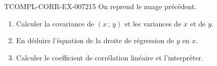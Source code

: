 \begin{exercice}{TCOMPL-CORR-EX-007}{2}{15}
On reprend le nuage précédent.
\begin{enumerate}
  \item Calculer la covariance de $(x\,;\,y)$ et les variances de $x$ et
        de $y$.
  \item En déduire l'équation de la droite de régression de $y$ en $x$.
  \item Calculer le coefficient de corrélation linéaire et l'interpréter.
\end{enumerate}
\end{exercice}
